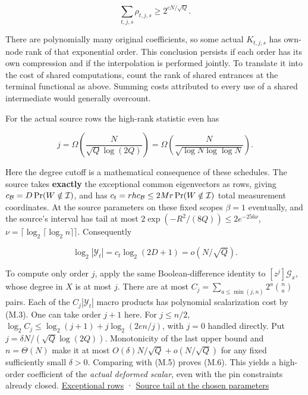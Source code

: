 \documentclass[
  11pt,
]{article}
\begin{document}
\[
 \sum_{t,j,s}\rho_{t,j,s}\ge2^{cN/\sqrt Q}.
\tag{M.5}
\]

There are polynomially many original coefficients, so some actual
\(K_{t,j,s}\) has own-node rank of that exponential order. This
conclusion persists if each order has its own compression and if the
interpolation is performed jointly. To translate it into the cost of
shared computations, count the rank of shared entrances at the terminal
functional as above. Summing costs attributed to every use of a shared
intermediate would generally overcount.

For the actual source rows the high-rank statistic even has

\[
 j=\Omega\!\left(\frac{N}{\sqrt Q\log(2Q)}\right)
  =\Omega\!\left(\frac{N}{\sqrt{\log N\log\log N}}\right).
\tag{M.6}
\]

Here the degree cutoff is a mathematical consequence of these schedules.
The source takes \textbf{exactly} the exceptional common eigenvectors as
rows, giving \(c_{\cal B}=D\Pr(W\notin\mathcal I)\), and has
\(c_t=r h c_{\cal B}\le2Mr\Pr(W\notin\mathcal I)\) total measurement
coordinates. At the source parameters on these fixed scopes \(\beta=1\)
eventually, and the source's interval has tail at most
\(2\exp(-R^2/(8Q))\le2e^{-256\nu}\),
\(\nu=\lceil\log_2\lceil\log_2n\rceil\rceil\). Consequently

\[
 \log_2 |\mathcal Y_t|= c_t\log_2(2D+1)=o(N/\sqrt Q).
\]

To compute only order \(j\), apply the same Boolean-difference identity
to \([z^j]\mathcal G_x\), whose degree in \(X\) is at most \(j\). There
are at most \(C_j=\sum_{a\le \min(j,n)}2^a\binom{n}{a}\) pairs. Each of
the \(C_j|\mathcal Y_t|\) macro products has polynomial scalarization
cost by (M.3). One can take order \(j+1\) here. For \(j\le n/2\),
\(\log_2 C_j\le \log_2(j+1)+j\log_2(2en/j)\), with \(j=0\) handled
directly. Put \(j=\delta N/(\sqrt Q\log(2Q))\). Monotonicity of the last
upper bound and \(n=\Theta(N)\) make it at most
\(O(\delta)N/\sqrt Q+o(N/\sqrt Q)\) for any fixed sufficiently small
\(\delta>0\). Comparing with (M.5) proves (M.6). This yields a
high-order coefficient of the \emph{actual deformed scalar}, even with
the pin constraints already closed.
\href{https://github.com/openai/math/blob/main/preprints/The-Exponential-Time-Hypothesis-is-False-October-25-2026/build/main_full_version.tex\#L2232-L2276}{Exceptional
rows} ·
\href{https://github.com/openai/math/blob/main/preprints/The-Exponential-Time-Hypothesis-is-False-October-25-2026/build/main_full_version.tex\#L1357-L1413}{Source
tail at the chosen parameters}
\end{document}
